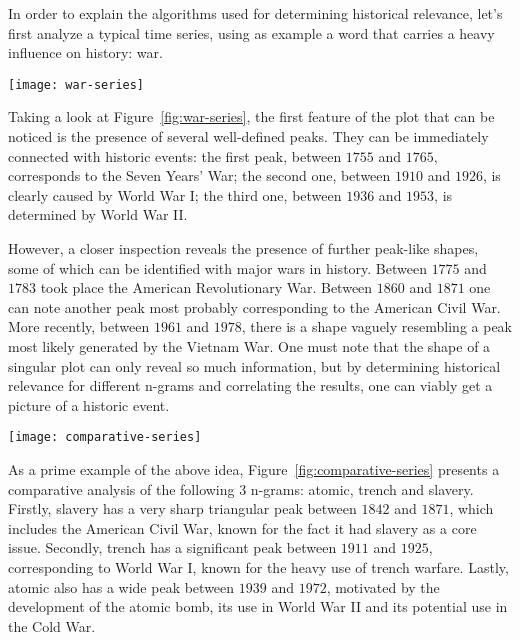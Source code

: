
In order to explain the algorithms used for determining historical relevance, let's first analyze a typical time series, using as example a word that carries a heavy influence on history: war.

\begin{figure*}[ht]
\centering
\texttt{[image: war-series]}
\caption{Ngram time series for war}
\label{fig:war-series}
\end{figure*}

Taking a look at Figure~\ref{fig:war-series}, the first feature of the plot that can be noticed is the presence of several well-defined peaks. They can be immediately connected with historic events: the first peak, between $1755$ and $1765$, corresponds to the Seven Years' War; the second one, between $1910$ and $1926$, is clearly caused by World War I; the third one, between $1936$ and $1953$, is determined by World War II.

However, a closer inspection reveals the presence of further peak-like shapes, some of which can be identified with major wars in history. Between $1775$ and $1783$ took place the American Revolutionary War. Between $1860$ and $1871$ one can note another peak most probably corresponding to the American Civil War. More recently, between $1961$ and $1978$, there is a shape vaguely resembling a peak most likely generated by the Vietnam War. One must note that the shape of a singular plot can only reveal so much information, but by determining historical relevance for different n-grams and correlating the results, one can viably get a picture of a historic event.

\begin{figure*}[ht]
\centering
\texttt{[image: comparative-series]}
\caption{Ngram time series for atomic, trench and slavery}
\label{fig:comparative-series}
\end{figure*}

As a prime example of the above idea, Figure~\ref{fig:comparative-series} presents a comparative analysis of the following 3 n-grams: atomic, trench and slavery. Firstly, slavery has a very sharp triangular peak between $1842$ and $1871$, which includes the American Civil War, known for the fact it had slavery as a core issue. Secondly, trench has a significant peak between $1911$ and $1925$, corresponding to World War I, known for the heavy use of trench warfare. Lastly, atomic also has a wide peak between $1939$ and $1972$, motivated by the development of the atomic bomb, its use in World War II and its potential use in the Cold War.

